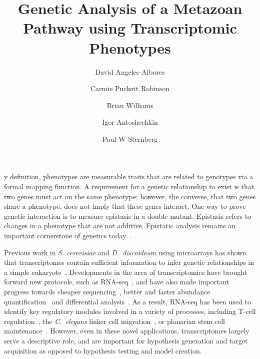 \documentclass[9pt,twocolumn,twoside]{pnas-new}
\title{Genetic Analysis of a Metazoan Pathway using Transcriptomic Phenotypes}
\author[a,b,*]{David Angeles-Albores}
\author[a,b,*]{Carmie Puckett Robinson}
\author[a]{Brian Williams}
\author[a]{Igor Antoshechkin}
\author[a,b]{Paul W Sternberg}
\affil[a]{Department of Biology and Biological Engineering, Caltech, Pasadena, USA, 91125}
\affil[b]{Howard Hughes Medical Institute}
\affil[*]{These authors contributed equally to this manuscript}
\newcommand{\cel}{\emph{C.~elegans}}
\newcommand{\dicty}{\emph{D.~discoideum}}
\begin{document}
\verticaladjustment{-2pt}

\maketitle
\thispagestyle{firststyle}

y definition, phenotypes are measurable traits that are related to genotypes via a formal mapping function. A requirement for a genetic relationship to exist is that two genes must act on the same phenotype; however, the converse, that two genes share a phenotype, does not imply that these genes interact. One way to prove genetic interaction is to measure epistasis in a double mutant. Epistasis refers to changes in a phenotype that are not additive. Epistatic analysis remains an important cornerstone of genetics today~\cite{Phillips2008}.

Previous work in \emph{S. cerevisiae} and \dicty{} using microarrays has shown that transcriptomes contain sufficient information to infer genetic relationships in a simple eukaryote~\cite{Hughes2000, VanDriessche2005}. Developments in the area of transcriptomics have brought forward new protocols, such as RNA-seq~\cite{Mortazavi2008}, and have also made important progress towards cheaper sequencing~\cite{Metzker2010}, better and faster abundance quantification~\cite{Patro2014, Bray2015,Patro2015} and differential analysis~\cite{Pimentel2016,Trapnell2013}.
As a result, RNA-seq has been used to identify key regulatory modules involved in a variety of processes, including T-cell regulation~\cite{Singer2016,Shalek2013}, the \cel{} linker cell migration~\cite{Schwarz2012}, or planarian stem cell maintenance~\cite{VanWolfswinkel2014,Scimone2014}. However, even in these novel applications, transcriptomes largely serve a descriptive role, and are important for hypothesis generation and target acquisition as opposed to hypothesis testing and model creation.
\end{document}
